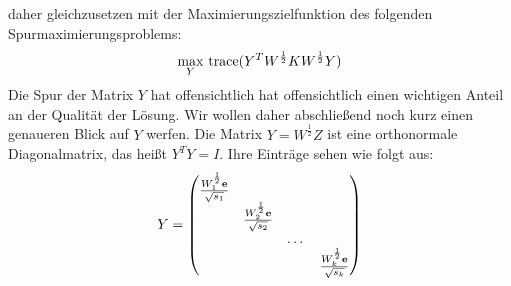 daher gleichzusetzen mit der Maximierungszielfunktion des folgenden Spurmaximierungsproblems:
\begin{align}
\label{formula:wkkm-tracemax}
	\max_{Y}{} \operatorname*{trace}( Y^T W^{\frac{1}{2}} K W^{\frac{1}{2}} Y )
\end{align}
Die Spur der Matrix $Y$ hat offensichtlich hat offensichtlich einen wichtigen Anteil an der Qualität der Lösung. Wir wollen daher
abschließend noch kurz einen genaueren Blick auf $Y$ werfen.
Die Matrix $Y = W^{\frac{1}{2}} Z$ ist eine orthonormale Diagonalmatrix, das heißt $Y^T Y = I$. Ihre Einträge sehen
wie folgt aus:
\[ Y = 	\begin{pmatrix}
			\frac{W_1^{\frac{1}{2}} \mathbf{e}}{\sqrt{s_1}} & & & \\
			& \frac{W_2^{\frac{1}{2}} \mathbf{e}}{\sqrt{s_2}} & & \\
			& & \dots & \\
			& & & \frac{W_k^{\frac{1}{2}} \mathbf{e}}{\sqrt{s_k}}
		\end{pmatrix} \]

